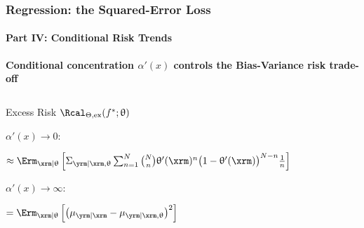 \documentclass[aspectratio=169,usenames,dvipsnames]{beamer}
\begin{document}
\begin{frame}
\frametitle{Regression: the Squared-Error Loss}
\framesubtitle{Part IV: Conditional Risk Trends}

\textbf{Conditional concentration $\alpha'(x)$ controls the Bias-Variance risk trade-off}


\begin{columns}[c]

\begin{column}{0.55\linewidth}



\begin{block}{Excess Risk $\Rcal_{\Theta, \mathrm{ex}}(f^* ; \uptheta)$}

\small
\vspace{1em}
\underline{$\alpha'(x) \to 0$}:
\vspace{0.25em}

$\approx \Erm_{\xrm | \uptheta}\left[ \Sigma_{\yrm | \xrm,\uptheta} \sum_{n=1}^N \binom{N}{n} \uptheta'(\xrm)^n \big( 1 - \uptheta'(\xrm) \big)^{N-n} \frac{1}{n} \right] $

\vspace{2.25em}
\underline{$\alpha'(x) \to \infty$}:
\vspace{0.25em}

$= \Erm_{\xrm | \uptheta}\left[ \left( \mu_{\yrm | \xrm} - \mu_{\yrm | \xrm,\uptheta} \right)^2 \right]$

\end{block}


\normalsize

\end{column}

\begin{column}{0.45\linewidth}


\end{column}
\end{columns}
\end{frame}
\end{document}
